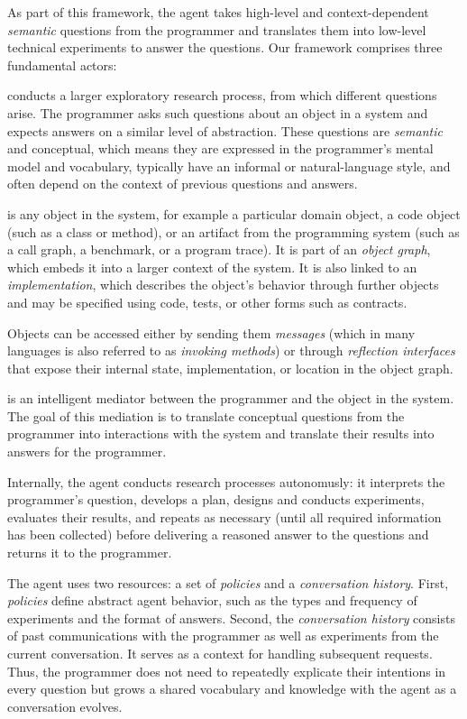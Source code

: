 As part of this framework, the agent takes high-level and context-dependent \emph{semantic} questions from the programmer and translates them into low-level technical experiments to answer the questions.
Our framework comprises three fundamental actors:

\begin{description}[noextralabelsep]
	\item[The programmer] conducts a larger exploratory research process, from which different questions arise.
	The programmer asks such questions about an object in a system and expects answers on a similar level of abstraction.
	These questions are \emph{semantic} and conceptual, which means they are expressed in the programmer's mental model and vocabulary, typically have an informal or natural-language style, and often depend on the context of previous questions and answers.

	\item[The object] is any object in the system, for example a particular domain object, a code object (such as a class or method), or an artifact from the programming system (such as a call graph, a benchmark, or a program trace).
	It is part of an \emph{object graph}, which embeds it into a larger context of the system.
	It is also linked to an \emph{implementation}, which describes the object's behavior through further objects and may be specified using code, tests, or other forms such as contracts.

	Objects can be accessed either by sending them \emph{messages} (which in many languages is also referred to as \emph{invoking methods}) or through \emph{reflection interfaces} that expose their internal state, implementation, or location in the object graph.

	\item[The exploratory programming agent] is an intelligent mediator between the programmer and the object in the system.
	The goal of this mediation is to translate conceptual questions from the programmer into interactions with the system and translate their results into answers for the programmer.

	Internally, the agent conducts research processes autonomusly: it interprets the programmer's question, develops a plan, designs and conducts experiments, evaluates their results, and repeats as necessary (until all required information has been collected) before delivering a reasoned answer to the questions and returns it to the programmer.

	The agent uses two resources: a set of \emph{policies} and a \emph{conversation history}.
	First, \emph{policies} define abstract agent behavior, such as the types and frequency of experiments and the format of answers.
	Second, the \emph{conversation history} consists of past communications with the programmer as well as experiments from the current conversation.
	It serves as a context for handling subsequent requests.
	Thus, the programmer does not need to repeatedly explicate their intentions in every question but grows a shared vocabulary and knowledge with the agent as a conversation evolves.
\end{description}

